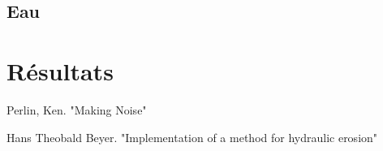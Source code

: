 \documentclass[11pt]{article} %
\begin{document}
\subsection{Eau}



\section{Résultats}




\begin{thebibliography}{9}
Perlin, Ken. "Making Noise"

Hans Theobald Beyer. "Implementation of a method for hydraulic erosion"
\end{thebibliography}
\end{document}
